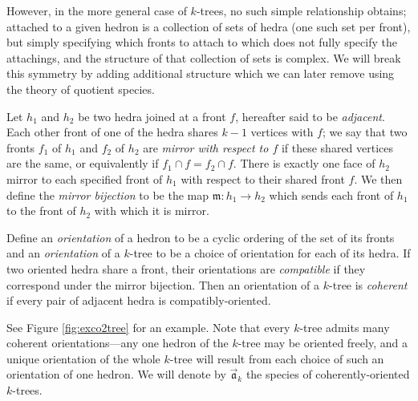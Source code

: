 \documentclass[sectionflow,singlespace,twoside,boldmathhdr]{brandiss} %
\numberwithin{section}{chapter}
\numberwithin{figure}{chapter}
\begin{document}
However, in the more general case of $k$-trees, no such simple relationship obtains; attached to a given hedron is a collection of sets of hedra (one such set per front), but simply specifying which fronts to attach to which does not fully specify the attachings, and the structure of that collection of sets is complex.
We will break this symmetry by adding additional structure which we can later remove using the theory of quotient species.

\begin{definition}
  \label{def:mirrorfronts}
  Let $h_{1}$ and $h_{2}$ be two hedra joined at a front $f$, hereafter said to be \emph{adjacent}.
  Each other front of one of the hedra shares $k-1$ vertices with $f$; we say that two fronts $f_{1}$ of $h_{1}$ and $f_{2}$ of $h_{2}$ are \emph{mirror with respect to $f$} if these shared vertices are the same, or equivalently if $f_{1} \cap f = f_{2} \cap f$.
  There is exactly one face of $h_{2}$ mirror to each specified front of $h_{1}$ with respect to their shared front $f$.
  We then define the \emph{mirror bijection} to be the map $\mathfrak{m}: h_{1} \to h_{2}$ which sends each front of $h_{1}$ to the front of $h_{2}$ with which it is mirror.
\end{definition}

\begin{comment} Don't think we need this after all...
  \begin{definition}\label{def:cycord}
    For a set $A$, define a \emph{cyclic order of $A$} to be a labeling of the cyclic digraph $\overrightarrow{C}_{\abs{A}}$ by $A$ and let $\cyc A$ be the set of such linear orders. Let $\lin A$ be the set of linear orders on $A$. Let $\psi_{A}: \lin A \to \cyc A$ (hereafter denoted simply $\psi$ when the set is unambiguous) send each linear order $\ell$ to the cyclic order obtained by decorating $\overrightarrow{C}_{\abs{A}}$ with $\ell$ in order. (Note that this map is $\abs{A}$-to-one.) Then a \emph{linearization} of a given cyclic order $c \in \cyc A$ is an element of $\psi^{-1} \pbrac{c}$.
  \end{definition}
\end{comment}

\begin{definition}
  \label{def:coktree}
  Define an \emph{orientation} of a hedron to be a cyclic ordering of the set of its fronts and an \emph{orientation} of a $k$-tree to be a choice of orientation for each of its hedra.
  If two oriented hedra share a front, their orientations are \emph{compatible} if they correspond under the mirror bijection.
  Then an orientation of a $k$-tree is \emph{coherent} if every pair of adjacent hedra is compatibly-oriented.
\end{definition}
See Figure \ref{fig:exco2tree} for an example.
Note that every $k$-tree admits many coherent orientations---any one hedron of the $k$-tree may be oriented freely, and a unique orientation of the whole $k$-tree will result from each choice of such an orientation of one hedron.
We will denote by $\vec{\mathfrak{a}}_{k}$ the species of coherently-oriented $k$-trees.
\end{document}
